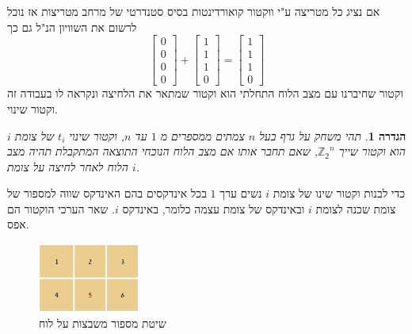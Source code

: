\documentclass[12pt,leqno]{article}
\theoremstyle{theoremdd}
\newtheorem{definition}{הגדרה}
\newcommand{\Zn}{{\mathbb{Z}_2}^n}
\begin{document}
 אם נציג כל מטריצה ע"י ווקטור קואורדינטות בסיס סטנדרטי של מרחב מטריצות אז נוכל לרשום את השוויון הנ"ל גם כך
 \[ 
    \begin{bmatrix} 
    0 \\ 0 \\ 0 \\ 0
    \end{bmatrix} +  \begin{bmatrix} 
    1 \\ 1 \\ 1 \\ 0
    \end{bmatrix} =  \begin{bmatrix} 
    1 \\ 1 \\ 1 \\ 0
    \end{bmatrix}  
 \]
וקטור שחיברנו עם מצב הלוח התחלתי הוא וקטור שמתאר את הלחיצה ונקראה לו בעבודה זה וקטור שינוי.
 \begin{definition}
    תהי 
    משחק על גרף בעל
    $n$
    צמתים
    ממספרים מ
    $1$
    עד
    $n$,
    וקטור שינוי
    $t_i$
    של צומת  
    $i$
    הוא 
    וקטור 
    שייך 
    $\Zn$,
    שאם תחבר אותו אם מצב הלוח הנוכחי 
    התוצאה המתקבלת תהיה מצב הלוח 
    לאחר לחיצה על צומת 
    $i$.
\end{definition}
כדי לבנות וקטור שינו 
של 
צומת 
$i$
נשים ערך 
$1$
בכל אינדקסים 
בהם האינדקס שווה 
למספור 
של 
צומת 
שכנה
לצומת
$i$
ובאינדקס של צומת עצמה
כלומר,
באינדקס 
$i$.
שאר הערכי הוקטור הם אפס.

\begin{figure}[ht]
    \caption{שיטת מספור משבצות על לוח}
    \label{fig:numbering_board_2x2}
    \centering
    \includegraphics[width=0.3\textwidth,keepaspectratio]{images/2x3_board.PNG}
\end{figure}
\end{document}
